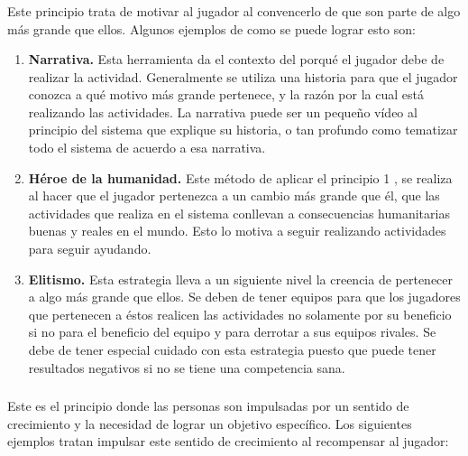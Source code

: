     \subsubsection{\principioI}
    \label{subsec:principioI}
  
    Este principio trata de motivar al jugador al convencerlo de que son parte de algo más grande que ellos.\cite[p. 66]{libro2} Algunos ejemplos de como se puede lograr esto son:
    
    \begin{enumerate}
    
        \item {\bf Narrativa.} Esta herramienta da el contexto del porqué el jugador debe de realizar la actividad. Generalmente se utiliza una historia para que el jugador conozca a qué motivo más grande pertenece, y la razón por la cual está realizando las actividades. La narrativa puede ser un pequeño vídeo al principio del sistema que explique su historia, o tan profundo como tematizar todo el sistema de acuerdo a esa narrativa.\cite[p. 81]{libro2}
        
        \item {\bf Héroe de la humanidad.} Este método de aplicar el principio 1 \principioI, se realiza al hacer que el jugador pertenezca a un cambio más grande que él, que las actividades que realiza en el sistema conllevan a consecuencias humanitarias buenas y reales en el mundo. Esto lo motiva a seguir realizando actividades para seguir ayudando.\cite[p. 82]{libro2}
        
        \item {\bf Elitismo.} Esta estrategia lleva a un siguiente nivel la creencia de pertenecer a algo más grande que ellos. Se deben de tener equipos para que los jugadores que pertenecen a éstos realicen las actividades no solamente por su beneficio si no para el beneficio del equipo y para derrotar a sus equipos rivales. Se debe de tener especial cuidado con esta estrategia puesto que puede tener resultados negativos si no se tiene una competencia sana.\cite[p. 83]{libro2}
    
    \end{enumerate}
    
    \subsubsection{\principioII}
    \label{subsec:principioII}
    
    Este es el principio donde las personas son impulsadas por un sentido de crecimiento y la necesidad de lograr un objetivo específico.\cite[p. 91]{libro2} Los siguientes ejemplos tratan impulsar este sentido de crecimiento al recompensar al jugador:
    
